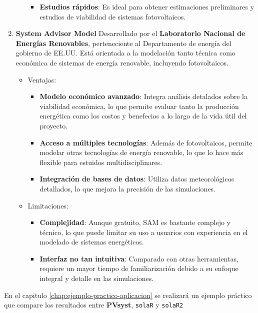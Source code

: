 \begin{enumerate}
\begin{itemize}
\begin{itemize}
\item \textbf{Estudios rápidos}: Es ideal para obtener estimaciones preliminares y estudios de viabilidad de sistemas fotovoltaicos.
\end{itemize}
\end{itemize}
\item \textbf{System Advisor Model} \cite{sam}
Desarrollado por el \textbf{Laboratorio Nacional de Energías Renovables}, perteneciente al Departamento de energía del gobierno de EE.UU. Está orientada a la modelación tanto técnica como económica de sistemas de energía renovable, incluyendo fotovoltaicos.
\begin{itemize}
\item Ventajas:
\begin{itemize}
\item \textbf{Modelo económico avanzado}: Integra análisis detalados sobre la viabilidad económica, lo que permite evaluar tanto la producción energética como los costos y benefecios a lo largo de la vida útil del proyecto.
\item \textbf{Acceso a múltiples tecnologías}: Además de fotovoltaicos, permite modelar otras tecnologías de energía renovable, lo que lo hace más flexible para estuidos multidisciplinares.
\item \textbf{Integración de bases de datos}: Utiliza datos meteorológicos detallados, lo que mejora la precisión de las simulaciones.
\end{itemize}
\item Limitaciones:
\begin{itemize}
\item \textbf{Complejidad}: Aunque gratuito, SAM es bastante complejo y técnico, lo que puede limitar su uso a usuarios con experiencia en el modelado de sistemas energéticos.
\item \textbf{Interfaz no tan intuitiva}: Comparado con otras herramientas, requiere un mayor tiempo de familiarización debido a su enfoque integral y detalle en las simulaciones.
\end{itemize}
\end{itemize}
\end{enumerate}
En el capitulo \ref{chap:ejemplo-practico-aplicacion} se realizará un ejemplo práctico que compare los resultados entre \textbf{PVsyst}, \texttt{solaR} y \texttt{solaR2}
